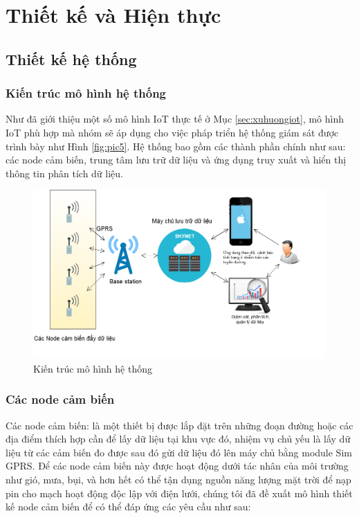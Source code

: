 \ifpdf
\graphicspath{{Chapter3/Figs/Raster/}{Chapter3/Figs/PDF/}{Chapter3/Figs/}{Chapter3/Figs/Web/}{Chapter3/Figs/Server/}{Chapter3/Figs/Mobile/}}
\else
\graphicspath{{Chapter3/Figs/Vector/}{Chapter3/Figs/}}
\fi

\chapter{Thiết kế và Hiện thực}
\section{Thiết kế hệ thống}
\subsection{Kiến trúc mô hình hệ thống}
Như đã giới thiệu một số mô hình IoT thực tế ở Mục \ref{sec:xuhuongiot}, mô hình IoT phù hợp mà nhóm sẽ áp dụng cho việc pháp triển hệ thống giám sát được trình bày như Hình \ref{fig:pic5}. Hệ thống bao gồm các thành phần chính như sau: các node cảm biến, trung tâm lưu trữ dữ liệu và ứng dụng truy xuất và hiển thị thông tin phân tích dữ liệu.

\begin{figure}[H]
	\centering    
	\includegraphics[width=1\textwidth]{system}
	\caption[Kiến trúc mô hình hệ thống]{Kiến trúc mô hình hệ thống}
	\label{fig:system}
\end{figure}

\newpage

\subsection{Các node cảm biến}
Các node cảm biến: là một thiết bị được lắp đặt trên những đoạn đường hoặc các địa điểm thích hợp cần để lấy dữ liệu tại khu vực đó, nhiệm vụ chủ yếu là lấy dữ liệu từ các cảm biến đo được sau đó gửi dữ liệu đó lên máy chủ bằng module Sim GPRS.
Để các node cảm biến này được hoạt động dưới tác nhân của môi trường như gió, mưa, bụi, và hơn hết có thể tận dụng nguồn năng lượng mặt trời để nạp pin cho mạch hoạt động độc lập với điện lưới, chúng tôi đã đề xuất mô hình thiết kế node cảm biến để có thể đáp ứng các yêu cầu như sau:
 
